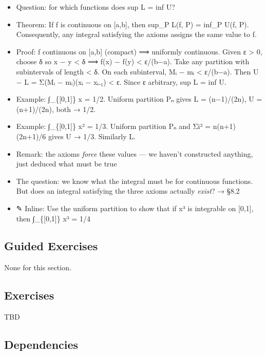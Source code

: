 \documentclass[
  10pt,
  letterpaper,
]{scrbook}
\providecommand{\tightlist}{%
  \setlength{\itemsep}{0pt}\setlength{\parskip}{0pt}}
\begin{document}
\begin{itemize}
\tightlist
\item
  Question: for which functions does sup L = inf U?
\item
  Theorem: If f is continuous on {[}a,b{]}, then sup\_P L(f, P) = inf\_P
  U(f, P). Consequently, any integral satisfying the axioms assigns the
  same value to f.
\item
  Proof: f continuous on {[}a,b{]} (compact) ⟹ uniformly continuous.
  Given ε \textgreater{} 0, choose δ so \textbar x − y\textbar{}
  \textless{} δ ⟹ \textbar f(x) − f(y)\textbar{} \textless{} ε/(b−a).
  Take any partition with subintervals of length \textless{} δ. On each
  subinterval, Mᵢ − mᵢ \textless{} ε/(b−a). Then U − L = Σ(Mᵢ − mᵢ)(xᵢ −
  xᵢ₋₁) \textless{} ε. Since ε arbitrary, sup L = inf U.
\item
  Example: ∫\_\{{[}0,1{]}\} x = 1/2. Uniform partition Pₙ gives L =
  (n−1)/(2n), U = (n+1)/(2n), both → 1/2.
\item
  Example: ∫\_\{{[}0,1{]}\} x² = 1/3. Uniform partition Pₙ and Σi² =
  n(n+1)(2n+1)/6 gives U → 1/3. Similarly L.
\item
  Remark: the axioms \emph{force} these values --- we haven't
  constructed anything, just deduced what must be true
\item
  The question: we know what the integral must be for continuous
  functions. But does an integral satisfying the three axioms actually
  \emph{exist}? → §8.2
\item
  ✎ Inline: Use the uniform partition to show that if x³ is integrable
  on {[}0,1{]}, then ∫\_\{{[}0,1{]}\} x³ = 1/4
\end{itemize}

\subsection{Guided Exercises}\label{guided-exercises-15}

None for this section.

\subsection{Exercises}\label{exercises-34}

TBD

\subsection{Dependencies}\label{dependencies-34}
\end{document}
